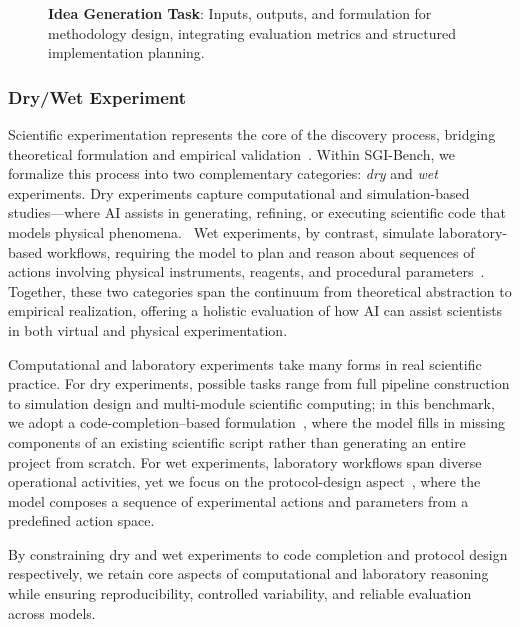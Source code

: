 \begin{figure}[ht]
    \vspace{0.01cm}
    \caption{\textbf{Idea Generation Task}: Inputs, outputs, and formulation for methodology design, integrating evaluation metrics and structured implementation planning.}
    \label{fig:Task Definition of Idea Generation}
\end{figure}

\subsubsection{Dry/Wet Experiment}
\label{sec: Task Definition of Experiment}
Scientific experimentation represents the core of the discovery process, bridging theoretical formulation and empirical validation~\cite{Wang2023}. Within SGI-Bench, we formalize this process into two complementary categories: \textit{dry} and \textit{wet} experiments. Dry experiments capture computational and simulation-based studies—where AI assists in generating, refining, or executing scientific code that models physical phenomena.~\cite{RomeraParedes2023,ma2024eureka} Wet experiments, by contrast, simulate laboratory-based workflows, requiring the model to plan and reason about sequences of actions involving physical instruments, reagents, and procedural parameters~\cite{Boiko2023,bran2023augmenting}. Together, these two categories span the continuum from theoretical abstraction to empirical realization, offering a holistic evaluation of how AI can assist scientists in both virtual and physical experimentation.

Computational and laboratory experiments take many forms in real scientific practice. For dry experiments, possible tasks range from full pipeline construction to simulation design and multi-module scientific computing; in this benchmark, we adopt a code-completion–based formulation~\cite{tian2024scicoderesearchcodingbenchmark}, where the model fills in missing components of an existing scientific script rather than generating an entire project from scratch. For wet experiments, laboratory workflows span diverse operational activities, yet we focus on the protocol-design aspect~\cite{Liu2025BioProBenchCD}, where the model composes a sequence of experimental actions and parameters from a predefined action space.

By constraining dry and wet experiments to code completion and protocol design respectively, we retain core aspects of computational and laboratory reasoning while ensuring reproducibility, controlled variability, and reliable evaluation across models.

